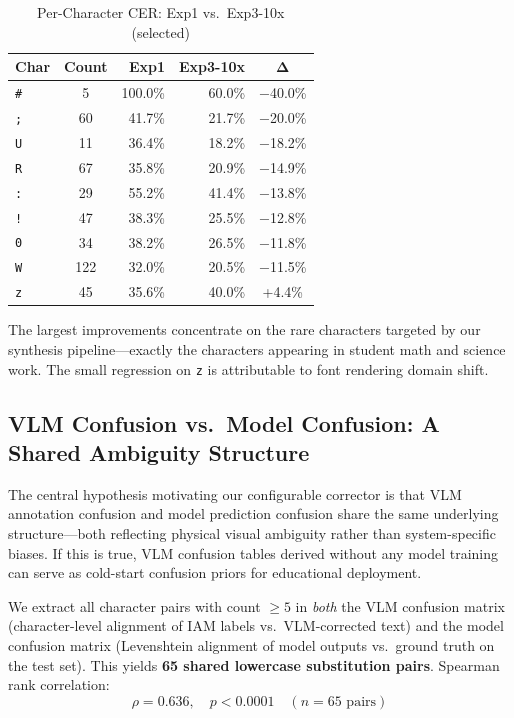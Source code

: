 \documentclass[conference]{IEEEtran}
\begin{document}
\begin{table}[h]
\centering
\caption{Per-Character CER: Exp1 vs.\ Exp3-10x (selected)}
\label{tab:perchar}
\begin{tabular}{@{}lcrrc@{}}
\toprule
\textbf{Char} & \textbf{Count} & \textbf{Exp1} & \textbf{Exp3-10x} & $\boldsymbol{\Delta}$ \\
\midrule
\texttt{\#} & 5   & 100.0\% & 60.0\%  & $-$40.0\% \\
\texttt{;}  & 60  & 41.7\%  & 21.7\%  & $-$20.0\% \\
\texttt{U}  & 11  & 36.4\%  & 18.2\%  & $-$18.2\% \\
\texttt{R}  & 67  & 35.8\%  & 20.9\%  & $-$14.9\% \\
\texttt{:}  & 29  & 55.2\%  & 41.4\%  & $-$13.8\% \\
\texttt{!}  & 47  & 38.3\%  & 25.5\%  & $-$12.8\% \\
\texttt{0}  & 34  & 38.2\%  & 26.5\%  & $-$11.8\% \\
\texttt{W}  & 122 & 32.0\%  & 20.5\%  & $-$11.5\% \\
\texttt{z}  & 45  & 35.6\%  & 40.0\%  & +4.4\%    \\
\bottomrule
\end{tabular}
\end{table}

The largest improvements concentrate on the rare characters targeted by our synthesis pipeline---exactly the characters appearing in student math and science work. The small regression on \texttt{z} is attributable to font rendering domain shift.

\subsection{VLM Confusion vs.\ Model Confusion: A Shared Ambiguity Structure}
\label{sec:crossmatrix}

The central hypothesis motivating our configurable corrector is that VLM annotation confusion and model prediction confusion share the same underlying structure---both reflecting physical visual ambiguity rather than system-specific biases. If this is true, VLM confusion tables derived without any model training can serve as cold-start confusion priors for educational deployment.

We extract all character pairs with count $\geq 5$ in \emph{both} the VLM confusion matrix (character-level alignment of IAM labels vs.\ VLM-corrected text) and the model confusion matrix (Levenshtein alignment of model outputs vs.\ ground truth on the test set). This yields \textbf{65 shared lowercase substitution pairs}. Spearman rank correlation:
\begin{equation}
  \rho = 0.636, \quad p < 0.0001 \quad (n = 65 \text{ pairs})
\end{equation}
\end{document}
